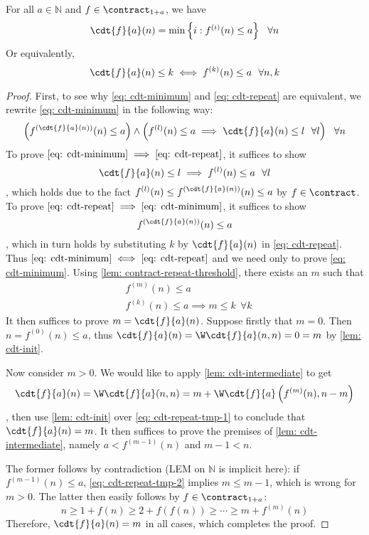 \begin{thm} \label{thm: cdt-repeat}
For all $a\in \mathbb{N}$ and $f\in \contract_{1+a}$, we have
\begin{equation} \label{eq: cdt-minimum}
\cdt{f}{a}(n) = \min\left\{ i : f^{(i)}(n) \le a \right\} \ \ \forall n
\end{equation}
Or equivalently,
\begin{equation} \label{eq: cdt-repeat}
\cdt{f}{a}(n) \le k \iff f^{(k)}(n) \le a \ \ \forall n, k
\end{equation}
\end{thm}
\begin{proof}
First, to see why \eqref{eq: cdt-minimum} and \eqref{eq: cdt-repeat} are equivalent, we rewrite \eqref{eq: cdt-minimum} in the following way:
$$ \left(f^{(\cdt{f}{a}(n))}(n) \le a\right) \wedge \left(f^{(l)}(n) \le a \implies \cdt{f}{a}(n) \le l \ \ \forall l\right) \ \ \forall n$$
To prove $\eqref{eq: cdt-minimum} \implies \eqref{eq: cdt-repeat}$, it suffices to show
$$ \cdt{f}{a}(n) \le l \implies f^{(l)}(n) \le a \ \ \forall l $$
, which holds due to the fact $\displaystyle f^{(l)}(n) \le f^{(\cdt{f}{a}(n))}(n) \le a$ by $f\in \contract$. To prove $\eqref{eq: cdt-repeat}\implies \eqref{eq: cdt-minimum}$, it suffices to show 
$$\displaystyle f^{(\cdt{f}{a}(n))}(n) \le a$$
, which in turn holds by substituting $k$ by $\cdt{f}{a}(n)$ in \eqref{eq: cdt-repeat}. Thus $\eqref{eq: cdt-minimum}\iff \eqref{eq: cdt-repeat}$ and we need only to prove \eqref{eq: cdt-minimum}. Using \cref{lem: contract-repeat-threshold}, there exists an $m$ such that
\begin{align}
& f^{(m)}(n) \le a \label{eq: cdt-repeat-tmp-1} \\
& f^{(k)}(n)\le a \implies m \le k \ \ \forall k \label{eq: cdt-repeat-tmp-2}
\end{align}
It then suffices to prove $m = \cdt{f}{a}(n)$. Suppose firstly that $m = 0$. Then $n = f^{(0)}(n)\le a$, thus $\cdt{f}{a}(n) = \W\cdt{f}{a}(n, n) = 0 = m$ by \cref{lem: cdt-init}.

Now consider $m > 0$. We would like to apply \cref{lem: cdt-intermediate} to get
$$ \cdt{f}{a}(n) = \W\cdt{f}{a}(n, n) = m + \W\cdt{f}{a}\left(f^{(m)}(n), n-m\right) $$
, then use \cref{lem: cdt-init} over \eqref{eq: cdt-repeat-tmp-1} to conclude that $\cdt{f}{a}(n) = m$. It then suffices to prove the premises of \cref{lem: cdt-intermediate}, namely $a < f^{(m-1)}(n)$ and $m-1 < n$.

The former follows by contradiction (LEM on $\mathbb{N}$ is implicit here): if $f^{(m-1)}(n) \le a$, \eqref{eq: cdt-repeat-tmp-2} implies $m\le m-1$, which is wrong for $m > 0$. The latter then easily follows by $f\in \contract_{1+a}$:
$$ n \ge 1 + f(n) \ge 2 + f(f(n)) \ge \cdots \ge m + f^{(m)}(n) $$
Therefore, $\cdt{f}{a}(n) = m$ in all cases, which completes the proof.
\end{proof}

